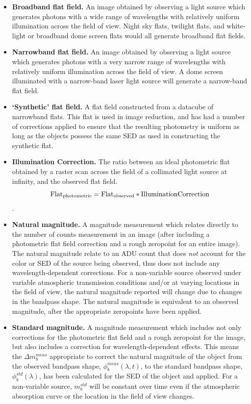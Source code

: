 \documentclass[12pt,preprint]{aastex}
\begin{document}
\begin{itemize}
\item{{\bf Broadband flat field.} An image obtained by observing a
light source which generates photons with a wide range of wavelengths
with relatively uniform
illumination across the field of view. Night sky flats, twilight
flats, and white-light or broadband dome screen flats would all
generate broadband flat fields.}

\item{{\bf Narrowband flat field.} An image obtained by
    observing a light source which generates photons with a very
    narrow range of wavelengths  with relatively uniform illumination across the field
    of view. A dome screen illuminated with a narrow-band laser light
    source will generate a narrow-band flat field. }

\item{{\bf `Synthetic' flat field.} A flat field constructed from a datacube of
narrowband flats.  This flat is used in image reduction, and has had a
number of corrections applied to ensure that the resulting photometry
is uniform as long as the objects possess the same SED as used in 
constructing the synthetic flat.}

\item{{\bf Illumination Correction.} The ratio between an
	ideal photometric flat obtained by a raster scan across
	the field of a
	collimated light source at infinity,
    and the observed flat field. 
\begin{equation}
\rm{Flat}_{photometric} = \rm{Flat}_{observed} * \rm{Illumination
 Correction}
\end{equation}. 
}

\item{{\bf Natural magnitude.} A magnitude measurement which relates
    directly to the number of counts measurement in an image (after
    including a photometric flat field correction and a rough
    zeropoint for an entire image). The natural magnitude relate to
    an ADU count that does {\it not} account for the color or SED of
    the source being observed, thus does not include any
    wavelength-dependent corrections. For a non-variable source
    observed under variable atmospheric transmission conditions and/or at
    varying locations in the field of view, the natural magnitude
    reported will change due to changes in the bandpass shape. The
    natural magnitude is equivalent to an observed
    magnitude, after the appropriate zeropoints have been applied.} 

\item{{\bf Standard magnitude.} A magnitude measurement which includes
  not only corrections for the photometric flat field and a rough
  zeropoint for the image, but also includes a correction for
  wavelength-dependent effects. This means the $\Delta m_b^{meas}$
  appropriate to correct the natural magnitude of the object from the
  observed bandpass shape,  $\phi_b^{meas}(\lambda,t)$, to the
  standard bandpass shape, $\phi_b^{std}(\lambda)$, has been
  calculated for the SED of the object and applied.  For a
  non-variable source, $m_b^{std}$ will be constant over time even if
  the atmospheric absorption curve or the location in the field of
  view changes.}


\end{itemize}
\end{document}
